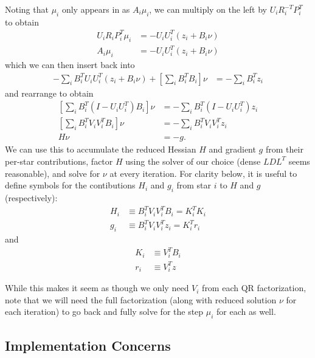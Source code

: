 Noting that $\mu_i$ only appears in  as $A_i\mu_i$, we can multiply  on the left by $U_i R_i^{-T} P_i^T$ to obtain
\begin{align}
    U_i R_i P_i^T \mu_i &= -U_i U_i^T \left(z_i + B_i\nu\right) \\
    A_i \mu_i &= -U_i U_i^T \left(z_i + B_i\nu\right) \label{eq:vp_star_subproblem_qr_2}
\end{align}
which we can then insert back into 
\begin{align}
    -\sum_i B_i^T U_i U_i^T \left(z_i + B_i\nu\right) + \left[\sum_i B_i^T B_i\right]\nu &= -\sum_i B_i^T z_i
\end{align}
and rearrange to obtain
\begin{align}
    \left[\sum_i B_i^T \left(I - U_i U_i^T\right) B_i\right]\nu &=
        -\sum_i B_i^T \left(I - U_i U_i^T\right) z_i \\
    \left[\sum_i B_i^T V_i V_i^T B_i\right]\nu &=
        -\sum_i B_i^T V_i V_i^T z_i \\
    H\nu &= -g.
\end{align}
We can use this to accumulate the reduced Hessian $H$ and gradient $g$ from their per-star contributions, factor $H$ using the solver of our choice (dense $LDL^T$ seems reasonable), and solve for $\nu$ at every iteration.
For clarity below, it is useful to define symbols for the contibutions $H_i$ and $g_i$ from star $i$ to $H$ and $g$ (respectively):
\begin{align}
    H_i &\equiv B_i^T V_i V_i^T B_i = K_i^T K_i \\
    g_i &\equiv B_i^T V_i V_i^T z_i = K_i^T r_i
\end{align}
and
\begin{align}
    K_i &\equiv V_i^T B_i \\
    r_i &\equiv V_i^T z
\end{align}

While this makes it seem as though we only need $V_i$ from each QR factorization, note that we will need the full factorization (along with reduced solution $\nu$ for each iteration) to go back and fully solve for the step $\mu_i$ for each  as well.

\subsection{Implementation Concerns}

